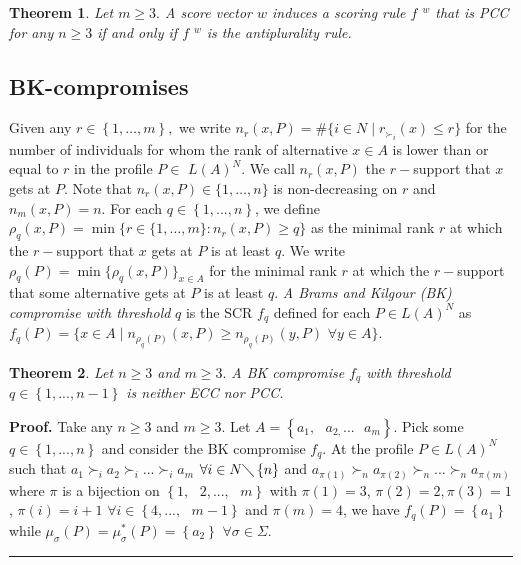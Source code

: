 \documentclass{article}
\newtheorem{theorem}{Theorem}
\newenvironment{proof}[1][Proof]{\noindent\textbf{#1.} }{\ \rule{0.5em}{0.5em}}
\begin{document}
\begin{theorem}
Let $m\geq 3.$ A score vector $w$ induces a scoring rule $f$ $^{w}$ that is
PCC for any $n\geq 3$ if and only if $f$ $^{w}$ is the antiplurality rule.
\end{theorem}

\subsection{BK-compromises}

Given any $r\in \left\{ 1,\ldots ,m\right\} ,$ we write $n_{r}(x,P)=\#\{i\in
N\mid r_{\succ _{i}}(x)\leq r\}$ for the number of individuals for whom the
rank of alternative $x\in A$ is lower than or equal to $r$ in the profile $%
P\in $ $L(A)^{N}$. We call $n_{r}(x,P)$ the $r-$support that $x$ gets at $P.$
Note that $n_{r}(x,P)\in \{1,\ldots ,n\}$ is non-decreasing on $r$ and $%
n_{m}(x,P)=n.$ For each $q\in \left\{ 1,...,n\right\} $, we define $\rho
_{q}(x,P)=\min \{r\in \{1,\ldots ,m\}:n_{r}(x,P)\geq q\}$ as the minimal
rank $r$ at which the $r-$support that $x$ gets at $P$ is at least $q$. We
write $\rho _{q}(P)=\min \{\rho _{q}(x,P)\}_{x\in A}$ for the minimal rank $%
r $ at which the $r-$support that some alternative gets at $P$ is at least $q
$. \textit{A Brams and Kilgour (BK) compromise with threshold }$q$ is the
SCR $f_{q}$ defined for each $P\in L(A)^{N}$ as $f_{q}(P)=\{x\in A\mid
n_{\rho _{q}(P)}(x,P)\geq n_{\rho _{q}(P)}(y,P)$ $\forall y\in A\}.$

\begin{theorem}
Let $n\geq 3$ and $m\geq 3.$ A BK compromise $f_{q}$ with threshold $q\in
\left\{ 1,...,n-1\right\} $ is neither ECC nor PCC.
\end{theorem}

\begin{proof}
Take any $n\geq 3$ and $m\geq 3.$ Let $A=\left\{ a_{1},\text{ }a_{2,}...%
\text{ }a_{m}\right\} $. Pick some $q\in \left\{ 1,...,n\right\} $ and
consider the BK compromise $f_{q}$. At the profile $P\in L(A)^{N}$ such that 
$a_{1}\succ _{i}a_{2}\succ _{i}...\succ _{i}a_{m}$ $\forall i\in N\diagdown
\left\{ n\right\} $ and $a_{\pi (1)}\succ _{n}a_{\pi (2)}\succ _{n}...\succ
_{n}a_{\pi (m)}$ where $\pi $ is a bijection on $\left\{ 1,\text{ }2,...,%
\text{ }m\right\} $ with $\pi (1)=3$, $\pi (2)=2,\pi (3)=1$, $\pi (i)=i+1$ $%
\forall i\in \left\{ 4,...,\text{ }m-1\right\} $ and $\pi (m)=4 $, we have $%
f_{q}(P)=\left\{ a_{1}\right\} $ while $\mu _{\sigma }(P)=\mu _{\sigma
}^{\ast }(P)=\left\{ a_{2}\right\} $ $\forall \sigma \in \Sigma $.
\end{proof}
\end{document}
